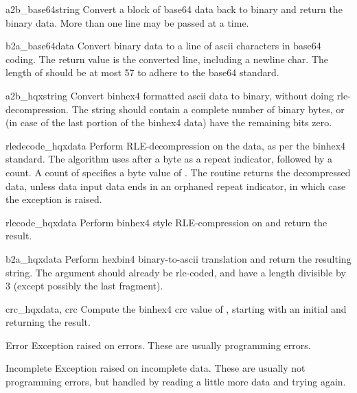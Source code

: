 \begin{funcdesc}{a2b_base64}{string}
Convert a block of base64 data back to binary and return the
binary data. More than one line may be passed at a time.
\end{funcdesc}

\begin{funcdesc}{b2a_base64}{data}
Convert binary data to a line of ascii characters in base64 coding.
The return value is the converted line, including a newline char.
The length of  should be at most 57 to adhere to the base64
standard.
\end{funcdesc}

\begin{funcdesc}{a2b_hqx}{string}
Convert binhex4 formatted ascii data to binary, without doing
rle-decompression. The string should contain a complete number of
binary bytes, or (in case of the last portion of the binhex4 data)
have the remaining bits zero.
\end{funcdesc}

\begin{funcdesc}{rledecode_hqx}{data}
Perform RLE-decompression on the data, as per the binhex4
standard. The algorithm uses  after a byte as a repeat
indicator, followed by a count. A count of  specifies a byte
value of . The routine returns the decompressed data,
unless data input data ends in an orphaned repeat indicator, in which
case the  exception is raised.
\end{funcdesc}

\begin{funcdesc}{rlecode_hqx}{data}
Perform binhex4 style RLE-compression on  and return the
result.
\end{funcdesc}

\begin{funcdesc}{b2a_hqx}{data}
Perform hexbin4 binary-to-ascii translation and return the resulting
string. The argument should already be rle-coded, and have a length
divisible by 3 (except possibly the last fragment).
\end{funcdesc}

\begin{funcdesc}{crc_hqx}{data, crc}
Compute the binhex4 crc value of , starting with an initial
 and returning the result.
\end{funcdesc}
 
\begin{excdesc}{Error}
Exception raised on errors. These are usually programming errors.
\end{excdesc}

\begin{excdesc}{Incomplete}
Exception raised on incomplete data. These are usually not programming
errors, but handled by reading a little more data and trying again.
\end{excdesc}
